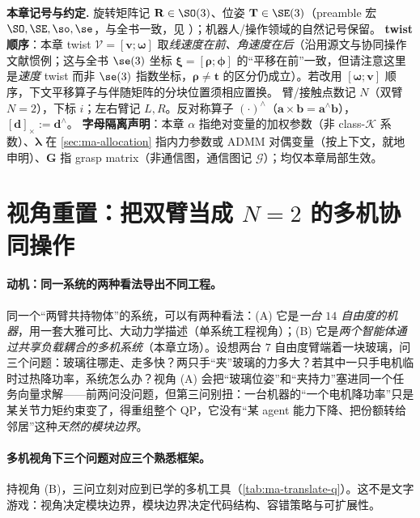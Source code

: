 \begin{note}
\textbf{本章记号与约定.}\;
旋转矩阵记 $\mathbf{R}\in\SO(3)$、位姿 $\mathbf{T}\in\SE(3)$（preamble 宏 $\SO,\SE,\so,\se$，与全书一致，见 ）；机器人/操作领域的自然记号保留。
\textbf{twist 顺序}：本章 twist $\boldsymbol{\mathcal{V}}=[\mathbf{v};\boldsymbol{\omega}]$ 取\emph{线速度在前、角速度在后}（沿用源文与协同操作文献惯例；这与全书 $\se(3)$ 坐标 $\boldsymbol{\xi}=[\boldsymbol{\rho};\boldsymbol{\phi}]$ 的“平移在前”一致，但请注意这里是\emph{速度} twist 而非 $\se(3)$ 指数坐标，$\boldsymbol{\rho}\neq\mathbf{t}$ 的区分仍成立）。若改用 $[\boldsymbol{\omega};\mathbf{v}]$ 顺序，下文平移算子与伴随矩阵的分块位置须相应置换。
臂/接触点数记 $N$（双臂 $N=2$），下标 $i$；左右臂记 $L,R$。反对称算子 $(\cdot)^\wedge$（$\mathbf{a}\times\mathbf{b}=\mathbf{a}^\wedge\mathbf{b}$），$[\mathbf{d}]_\times:=\mathbf{d}^\wedge$。
\textbf{字母隔离声明}：本章 $\alpha$ 指绝对变量的加权参数（非 class-$\mathcal{K}$ 系数）、$\boldsymbol{\lambda}$ 在 \cref{sec:ma-allocation} 指内力参数或 ADMM 对偶变量（按上下文，就地申明）、$\mathbf{G}$ 指 grasp matrix（非通信图，通信图记 $\mathcal{G}$）；均仅本章局部生效。
\end{note}

\section{视角重置：把双臂当成 \texorpdfstring{$N=2$}{N=2} 的多机协同操作}
\label{sec:ma-perspective}

\paragraph{动机：同一系统的两种看法导出不同工程。}
同一个“两臂共持物体”的系统，可以有两种看法：(A) 它是\emph{一台 $14$ 自由度的机器}，用一套大雅可比、大动力学描述（单系统工程视角）；(B) 它是\emph{两个智能体通过共享负载耦合的多机系统}（本章立场）。设想两台 $7$ 自由度臂端着一块玻璃，问三个问题：玻璃往哪走、走多快？两只手“夹”玻璃的力多大？若其中一只手电机临时过热降功率，系统怎么办？视角 (A) 会把“玻璃位姿”和“夹持力”塞进同一个任务向量求解——前两问没问题，但第三问别扭：一台机器的“一个电机降功率”只是某关节力矩约束变了，得重组整个 QP，它没有“某 agent 能力下降、把份额转给邻居”这种\emph{天然的模块边界}。

\paragraph{多机视角下三个问题对应三个熟悉框架。}
持视角 (B)，三问立刻对应到已学的多机工具（\cref{tab:ma-translate-q}）。这不是文字游戏：视角决定模块边界，模块边界决定代码结构、容错策略与可扩展性。

